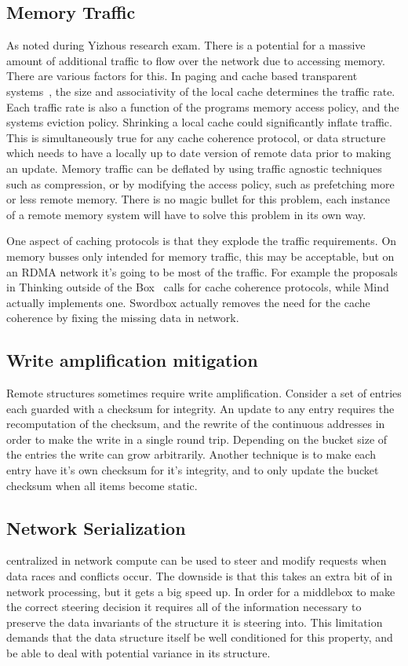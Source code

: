 \subsection{Memory Traffic} As noted during Yizhous research exam. There is a
potential for a massive amount of additional traffic to flow over the network
due to accessing memory. There are various factors for this. In paging and cache
based transparent systems~\cite{fastswap,kona,gms,infiniswap,legoos,lite}, the
size and associativity of the local cache determines the traffic rate. Each
traffic rate is also a function of the programs memory access policy, and the
systems eviction policy. Shrinking a local cache could significantly inflate
traffic. This is simultaneously true for any cache coherence protocol, or data
structure which needs to have a locally up to date version of remote data prior
to making an update. Memory traffic can be deflated by using traffic agnostic
techniques such as compression, or by modifying the access policy, such as
prefetching more or less remote memory. There is no magic bullet for this
problem, each instance of a remote memory system will have to solve this problem
in its own way.

One aspect of caching protocols is that they explode the traffic requirements.
On memory busses only intended for memory traffic, this may be acceptable, but
on an RDMA network it's going to be most of the traffic. For example the
proposals in Thinking outside of the Box~\cite{design-far-memory-struct} calls
for cache coherence protocols, while Mind~\cite{mind} actually implements one.
Swordbox actually removes the need for the cache coherence by fixing the missing
data in network.

\subsection{Write amplification mitigation}
\label{sec:write-amplification}
Remote structures sometimes require write
amplification. Consider a set of entries each guarded with a checksum for
integrity. An update to any entry requires the recomputation of the checksum,
and the rewrite of the continuous addresses in order to make the write in a
single round trip. Depending on the bucket size of the entries the write can
grow arbitrarily. Another technique is to make each entry have it's own checksum
for it's integrity, and to only update the bucket checksum when all items become
static.

\subsection{Network Serialization} 
\label{sec:net_ser}
%
centralized in network compute can be used to steer and modify
requests when data races and conflicts occur. The downside is that this takes an
extra bit of in network processing, but it gets a big speed up. In order for a
middlebox to make the correct steering decision it requires all of the
information necessary to preserve the data invariants of the structure it is
steering into. This limitation demands that the data structure itself be well
conditioned for this property, and be able to deal with potential variance in
its structure.

